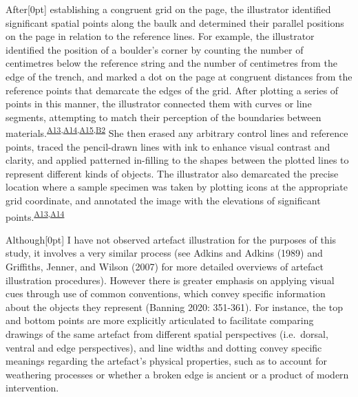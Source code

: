 \documentclass[
]{article}
\newcommand{\paragraphnumber}[1]{\marginnote{\color{lightgray}\tiny{#1}}[0pt]}
\begin{document}
After\paragraphnumber{[51]} establishing a congruent grid on the page,
the illustrator identified significant spatial points along the baulk
and determined their parallel positions on the page in relation to the
reference lines. For example, the illustrator identified the position of
a boulder's corner by counting the number of centimetres below the
reference string and the number of centimetres from the edge of the
trench, and marked a dot on the page at congruent distances from the
reference points that demarcate the edges of the grid. After plotting a
series of points in this manner, the illustrator connected them with
curves or line segments, attempting to match their perception of the
boundaries between
materials.\textsuperscript{\hyperref[sec-A13]{A13},\hyperref[sec-A14]{A14},\hyperref[sec-A15]{A15},\hyperref[sec-B2]{B2}}
She then erased any arbitrary control lines and reference points, traced
the pencil-drawn lines with ink to enhance visual contrast and clarity,
and applied patterned in-filling to the shapes between the plotted lines
to represent different kinds of objects. The illustrator also demarcated
the precise location where a sample specimen was taken by plotting icons
at the appropriate grid coordinate, and annotated the image with the
elevations of significant
points.\textsuperscript{\hyperref[sec-A13]{A13},\hyperref[sec-A14]{A14}}

Although\paragraphnumber{[52]} I have not observed artefact illustration
for the purposes of this study, it involves a very similar process (see
Adkins and Adkins (1989) and Griffiths, Jenner, and Wilson (2007) for
more detailed overviews of artefact illustration procedures). However
there is greater emphasis on applying visual cues through use of common
conventions, which convey specific information about the objects they
represent (Banning 2020: 351-361). For instance, the top and bottom
points are more explicitly articulated to facilitate comparing drawings
of the same artefact from different spatial perspectives (i.e.~dorsal,
ventral and edge perspectives), and line widths and dotting convey
specific meanings regarding the artefact's physical properties, such as
to account for weathering processes or whether a broken edge is ancient
or a product of modern intervention.
\end{document}
